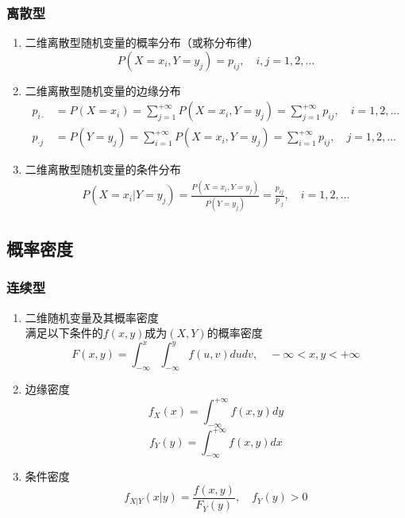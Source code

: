 \subsubsection{离散型}
\begin{enumerate}
	\item 二维离散型随机变量的概率分布（或称分布律）
	\begin{equation}
		P(X=x_i, Y=y_j) = p_{ij}, \quad i,j = 1, 2, \dots
	\end{equation}

	\item 二维离散型随机变量的边缘分布
	\begin{align}
		p_{i\cdot} &= P(X=x_i) 
		= \sum_{j=1}^{+\infty}P(X=x_i, Y=y_j) 
		= \sum_{j=1}^{+\infty}p_{ij}, \quad i = 1, 2, \dots \\
		p_{\cdot j} &= P(Y=y_j) 
		= \sum_{i=1}^{+\infty}P(X=x_i, Y=y_j) 
		= \sum_{i=1}^{+\infty}p_{ij}, \quad j = 1, 2, \dots 
	\end{align}
	\item 二维离散型随机变量的条件分布
	\begin{equation}\begin{aligned}
		P(X=x_i|Y=y_j) = \frac{P(X=x_i, Y=y_j)}{P(Y=y_j)} = \frac{p_{ij}}{p_{\cdot j}}, \quad i = 1, 2, \dots
	\end{aligned}\end{equation}


\end{enumerate}

\subsection{概率密度}
\subsubsection{连续型}
\begin{enumerate}
	\item 二维随机变量及其概率密度 \\
	满足以下条件的$f(x, y)$成为$(X, Y)$的概率密度 \\
	\begin{equation}
		F(x, y) = \int_{-\infty}^{x} \int_{-\infty}^{y}f(u, v)dudv, \quad -\infty <x, y < +\infty
	\end{equation}
	\item 边缘密度
	\begin{equation}
		f_X(x) = \int_{-\infty}^{+\infty}f(x, y)dy
	\end{equation}
	\begin{equation}
		f_Y(y) = \int_{-\infty}^{+\infty}f(x, y)dx
	\end{equation}
	\item 条件密度
	\begin{equation}
		f_{X|Y}(x|y) = \frac{f(x,y)}{F_Y(y)}, \quad f_Y(y) > 0
	\end{equation}
\end{enumerate}



